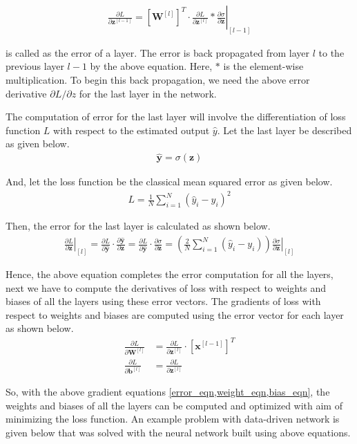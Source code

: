 \begin{align}
    \left.\frac{\partial L}{\partial \bm{z}^{[l-1]}} = \left[\bm{W}^{[l]} \right]^T \cdot \frac{\partial L}{\partial \bm{z}^{[l]}} * \frac{\partial \sigma}{\partial \bm{z}}\right\vert_{[l-1]} \label{error_eqn}
\end{align}

 is called as the error of a layer. The error is back
propagated from layer \(l\) to the previous layer \(l-1\) by the above
equation.  Here, \(*\) is the element-wise multiplication. To begin this back
propagation, we need the above error derivative \(\partial L/\partial z\) for
the last layer in the network. \\

\par{}
The computation of error for the last layer will involve the differentiation
of loss function \(L\) with respect to the estimated output \(\hat{y}\). Let
the last layer be described as given below.
\begin{align*}
    \bm{\hat{y}} = \sigma\left(\bm{z}\right)
\end{align*}

And, let the loss function be the classical mean squared error as given below.
\begin{align*}
    L = \frac{1}{N}\sum_{i=1}^{N} \left(\hat{y}_i - y_i\right)^2
\end{align*}

Then, the error for the last layer is calculated as shown below.
\begin{align*}
    \left.\frac{\partial L}{\partial \bm{z}}\right\vert_{[l]} = \frac{\partial L}{\partial \bm{\hat{y}}} \cdot \frac{\partial \bm{\hat{y}}}{\partial \bm{z}} = \frac{\partial L}{\partial \bm{\hat{y}}} \cdot \frac{\partial \sigma}{\partial \bm{z}} = \left(\frac{2}{N}\sum_{i=1}^{N}\left(\hat{y}_i - y_i\right)\right) \left.\frac{\partial \sigma}{\partial \bm{z}}\right\vert_{[l]}
\end{align*}

Hence, the above equation completes the error computation for all the layers, next
we have to compute the derivatives of loss with respect to weights and
biases of all the layers using these error vectors. The gradients of loss with
respect to weights and biases are computed using the error vector for each layer
as shown below.
\begin{align}
    \frac{\partial L}{\partial \bm{W}^{[l]}} &= \frac{\partial L}{\partial \bm{z}^{[l]}} \cdot \left[\bm{x}^{[l-1]}\right]^T \label{weight_eqn} \\
    \frac{\partial L}{\partial \bm{b}^{[l]}} &= \frac{\partial L}{\partial \bm{z}^{[l]}} \label{bias_eqn}
\end{align}

So, with the above gradient equations \cref{error_eqn,weight_eqn,bias_eqn}, the
weights and biases of all the layers can be computed and optimized with aim of
minimizing the loss function. An example problem with data-driven network is
given below that was solved with the neural network built using above
equations.
